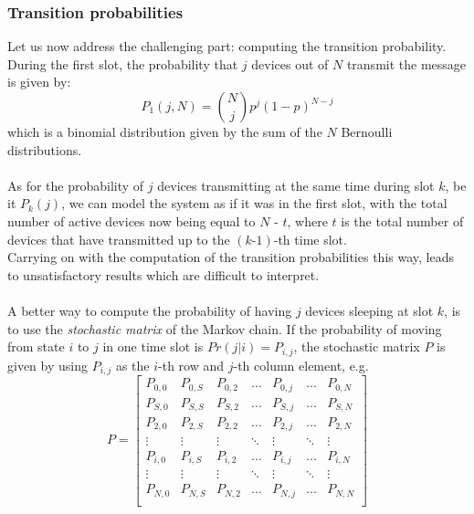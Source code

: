 \subsubsection{Transition probabilities}
Let us now address the challenging part: computing the transition probability.\\
During the first slot, the probability that $j$ devices out of $N$ transmit
the message is given by:
\begin{equation}
    P_{1}(j, N) = {N \choose j} p^{j} (1 - p)^{N - j}
    \label{eq:firstSlotTransProb}
\end{equation}
\hfill \break
which is a binomial distribution given by the sum of the $N$ Bernoulli
distributions.\\
\\
As for the probability of $j$ devices transmitting at the same time during slot
$k$, be it $P_{k}(j)$, we can model the system as if it was in the first slot,
with the total number of active devices now being equal to $N$ - $t$, where $t$
is the total number of devices that have transmitted up to the $(k\text{-}1)$-th
time slot.\\
Carrying on with the computation of the transition probabilities this way, leads
to unsatisfactory results which are difficult to interpret.\\
\\
A better way to compute the probability of having $j$ devices sleeping at
slot $k$, is to use the \textit{stochastic matrix} of the Markov chain. If the
probability of moving from state $i$ to $j$ in one time slot is
$Pr(j|i) = P_{i,j}$, the stochastic matrix $P$ is given by using
$P_{i,j}$ as the $i$-th row and $j$-th column element, e.g.
\begin{equation*}
P = 
\begin{bmatrix}
P_{0,0}	& P_{0,S}	& P_{0,2}	& \dots  	& P_{0,j}	& \dots		& P_{0,N} \\
P_{S,0}	& P_{S,S}	& P_{S,2}	& \dots  	& P_{S,j}	& \dots		& P_{S,N} \\
P_{2,0}	& P_{2,S}	& P_{2,2}	& \dots  	& P_{2,j}	& \dots		& P_{2,N} \\
\vdots	& \vdots	& \vdots	& \ddots 	& \vdots	& \ddots	& \vdots \\
P_{i,0}	& P_{i,S}	& P_{i,2}	& \dots		& P_{i,j}	& \dots		& P_{i,N} \\
\vdots	& \vdots	& \vdots	& \ddots	& \vdots	& \ddots	& \vdots \\
P_{N,0}	& P_{N,S}	& P_{N,2}	& \dots		& P_{N,j}	& \dots		& P_{N,N} \\
\end{bmatrix}
\label{stochasticMatrix1}
\end{equation*}
